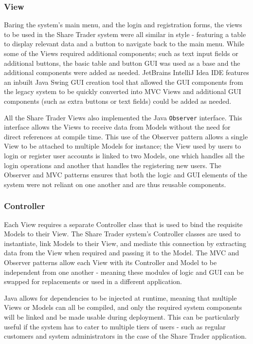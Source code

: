 \documentclass[12pt, a4paper,titlepage]{article}
\begin{document}
\subsubsection{View}
Baring the system's main menu, and the login and registration forms, the views
to be used in the Share Trader system were all similar in style - featuring a
table to display relevant data and a button to navigate back to the main menu.
While some of the Views required additional components; such as text input
fields or additional buttons, the basic table and button GUI was used as a
base and the additional components were added as needed.  
JetBrains IntelliJ Idea IDE features an inbuilt Java Swing GUI creation tool
that allowed the GUI components from the legacy system to be quickly converted
into MVC Views and additional GUI components (such as extra buttons or text
fields) could be added as needed.

All the Share Trader Views also implemented the Java {\tt Observer} interface. 
This interface allows the Views to receive data from Models without the
need for direct references at compile time. 
This use of the Observer pattern allows a single View to be attached to
multiple Models for instance; the View used by users to login or register user
accounts is linked to two Models, one which handles all the login operations
and another that handles the registering new users. 
The Observer and MVC patterns ensures that both the logic and GUI elements of
the system were not reliant on one another and are thus reusable components.

\subsubsection{Controller}
Each View requires a separate Controller class that is used to bind the
requisite Models to their View. 
The Share Trader system's Controller classes are used to instantiate, link
Models to their View, and mediate this connection by extracting data from the
View when required and passing it to the Model. 
The MVC and Observer patterns allow each View with its Controller and Model to
be independent from one another - meaning these modules of logic and GUI can
be swapped for replacements or used in a different application.

Java allows for dependencies to be injected at runtime, meaning that
multiple Views or Models can all be compiled, and only the required system
components will be linked and be made usable during deployment. 
This can be particularly useful if the system has to cater to multiple tiers
of users - such as regular customers and system administrators in the case of
the Share Trader application.
\end{document}
